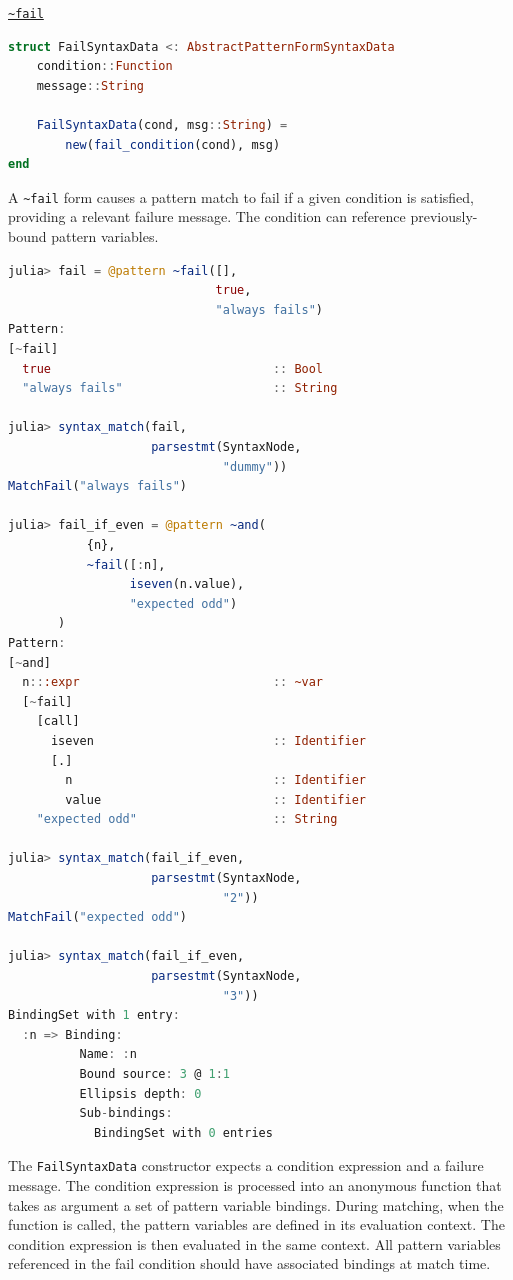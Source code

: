 \documentclass{juliacon}
\begin{document}
\vspace{0.2cm}
\label{org3caafc9}\vspace{0.2cm}
\underline{\texttt{\textasciitilde{}fail}}

\begin{lstlisting}[language=Julia]
struct FailSyntaxData <: AbstractPatternFormSyntaxData
    condition::Function
    message::String

    FailSyntaxData(cond, msg::String) =
        new(fail_condition(cond), msg)
end
\end{lstlisting}

A \texttt{\textasciitilde{}fail} form causes a pattern match to fail if a given condition is
satisfied, providing a relevant failure message. The condition can
reference previously-bound pattern variables.

\begin{lstlisting}[language=Julia]
julia> fail = @pattern ~fail([],
                             true,
                             "always fails")
Pattern:
[~fail]
  true                               :: Bool
  "always fails"                     :: String

julia> syntax_match(fail,
                    parsestmt(SyntaxNode,
                              "dummy"))
MatchFail("always fails")

julia> fail_if_even = @pattern ~and(
           {n},
           ~fail([:n],
                 iseven(n.value),
                 "expected odd")
       )
Pattern:
[~and]
  n:::expr                           :: ~var
  [~fail]
    [call]
      iseven                         :: Identifier
      [.]
        n                            :: Identifier
        value                        :: Identifier
    "expected odd"                   :: String

julia> syntax_match(fail_if_even,
                    parsestmt(SyntaxNode,
                              "2"))
MatchFail("expected odd")

julia> syntax_match(fail_if_even,
                    parsestmt(SyntaxNode,
                              "3"))
BindingSet with 1 entry:
  :n => Binding:
          Name: :n
          Bound source: 3 @ 1:1
          Ellipsis depth: 0
          Sub-bindings:
            BindingSet with 0 entries
\end{lstlisting}

The \texttt{FailSyntaxData} constructor expects a condition expression and a
failure message. The condition expression is processed into an
anonymous function that takes as argument a set of pattern variable
bindings. During matching, when the function is called, the pattern
variables are defined in its evaluation context. The condition
expression is then evaluated in the same context. All pattern
variables referenced in the fail condition should have associated
bindings at match time.
\end{document}
